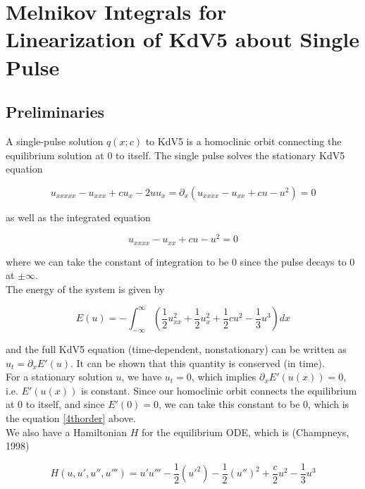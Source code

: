 \documentclass[12pt]{article}
\begin{document}
\section*{Melnikov Integrals for Linearization of KdV5 about Single Pulse}

\subsection*{Preliminaries}

A single-pulse solution $q(x; c)$ to KdV5 is a homoclinic orbit connecting the equilibrium solution at 0 to itself. The single pulse solves the stationary KdV5 equation

\begin{equation}
u_{xxxxx} - u_{xxx} + c u_x - 2 u u_x = \partial_x(u_{xxxx} - u_{xx} + c u - u^2) = 0
\end{equation}

as well as the integrated equation

\begin{equation}\label{4thorder}
u_{xxxx} - u_{xx} + c u - u^2 = 0
\end{equation}

where we can take the constant of integration to be 0 since the pulse decays to 0 at $\pm \infty$. \\

The energy of the system is given by 

\begin{equation} \label{energy}
E(u) = -\int_{-\infty}^{\infty} \left( \frac{1}{2}u_{xx}^2 + \frac{1}{2}u_x^2 + \frac{1}{2}cu^2 - \frac{1}{3}u^3 \right) dx
\end{equation}

and the full KdV5 equation (time-dependent, nonstationary) can be written as $u_t = \partial_x E'(u)$. It can be shown that this quantity is conserved (in time).\\

For a stationary solution $u$, we have $u_t = 0$, which implies $\partial_x E'(u(x)) = 0$, i.e. $E'(u(x))$ is constant. Since our homoclinic orbit connects the equilibrium at 0 to itself, and since $E'(0) = 0$, we can take this constant to be 0, which is the equation \eqref{4thorder} above. \\

We also have a Hamiltonian $H$ for the equilibrium ODE, which is (Champneys, 1998)

\begin{equation}\label{Hamiltonian}
H(u, u', u'', u''') = u'u''' - \frac{1}{2}(u'^2) - \frac{1}{2}(u'')^2 + \frac{c}{2}u^2 - \frac{1}{3}u^3 
\end{equation}
\end{document}
